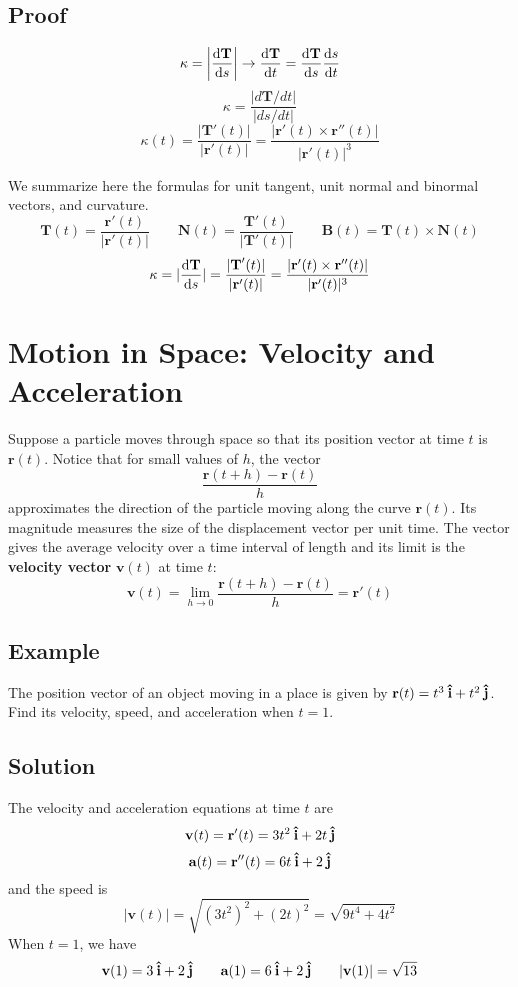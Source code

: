 \subsection*{Proof}
$$\kappa=\left|\dv{\textbf{T}}{s}\right|\to\dv{\textbf{T}}{t}=
    \dv{\textbf{T}}{s}\dv{s}{t}$$
$$\kappa=\frac{|d\textbf{T}/dt|}{|ds/dt|}$$
$$\kappa(t)=\frac{|\textbf{T}'(t)|}{|\textbf{r}'(t)|}
    =\frac{|\textbf{r}'(t)\times\textbf{r}''(t)|}{|\textbf{r}'(t)|^3}$$

We summarize here the formulas for unit tangent, unit normal and binormal vectors,
and curvature.
$$\textbf{T}(t)=\frac{\textbf{r}'(t)}{|\textbf{r}'(t)|} \qquad
    \textbf{N}(t)=\frac{\textbf{T}'(t)}{|\textbf{T}'(t)|} \qquad
    \textbf{B}(t)=\textbf{T}(t)\times\textbf{N}(t)$$
$$\kappa=|\dv{\textbf{T}}{s}|=\frac{|\textbf{T}'(t)|}{|\textbf{r}'(t)|}
    =\frac{|\textbf{r}'(t)\times\textbf{r}''(t)|}{|\textbf{r}'(t)|^3}$$

\section{Motion in Space: Velocity and Acceleration}
Suppose a particle moves through space so that its position vector at time $t$ is
$\textbf{r}(t)$. Notice that for small values of $h$, the vector
$$\frac{\textbf{r}(t+h)-\textbf{r}(t)}{h}$$
approximates the direction of the particle moving along the curve $\textbf{r}(t)$.
Its magnitude measures the size of the displacement vector per unit time. The vector
gives the average velocity over a time interval of length and its limit is the
\textbf{velocity vector} $\textbf{v}(t)$ at time $t$:
$$\textbf{v}(t)=\lim_{h\to 0}\frac{\textbf{r}(t+h)-\textbf{r}(t)}{h}=\textbf{r}'(t)$$

\subsection*{Example}
The position vector of an object moving in a place is given by $\textbf{r}(t)=
    t^3\:\boldsymbol{\hat{\textbf{i}}}+t^2\:\boldsymbol{\hat{\textbf{j}}}$. Find its velocity, speed, and acceleration when $t=1$.

\subsection*{Solution}
The velocity and acceleration equations at time $t$ are
$$\textbf{v}(t)=\textbf{r}'(t)=3t^2\:\boldsymbol{\hat{\textbf{i}}}+2t\:\boldsymbol{\hat{\textbf{j}}}$$
$$\textbf{a}(t)=\textbf{r}''(t)=6t\:\boldsymbol{\hat{\textbf{i}}}+2\:\boldsymbol{\hat{\textbf{j}}}$$
and the speed is
$$|\textbf{v}(t)|=\sqrt{(3t^2)^2+(2t)^2}=\sqrt{9t^4+4t^2}$$
When $t=1$, we have
$$\textbf{v}(1)=3\:\boldsymbol{\hat{\textbf{i}}}+2\:\boldsymbol{\hat{\textbf{j}}}\qquad\textbf{a}(1)=6\:\boldsymbol{\hat{\textbf{i}}}+2\:\boldsymbol{\hat{\textbf{j}}}\qquad|\textbf{v}(1)|=\sqrt{13}$$


